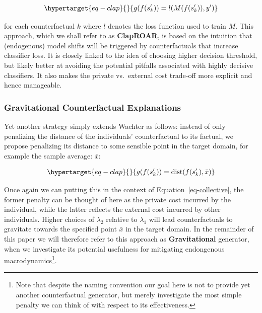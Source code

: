\documentclass[
  conference]{IEEEtran}
\begin{document}
\begin{equation}\protect\hypertarget{eq-clap}{}{
\begin{aligned}
g(f(s_k^\prime)) = l(M(f(s_k^\prime)),y^\prime)
\end{aligned}
}\label{eq-clap}\end{equation}

for each counterfactual \(k\) where \(l\) denotes the loss function used
to train \(M\). This approach, which we shall refer to as
\textbf{ClapROAR}, is based on the intuition that (endogenous) model
shifts will be triggered by counterfactuals that increase classifier
loss. It is closely linked to the idea of choosing higher decision
threshold, but likely better at avoiding the potential pitfalls
associated with highly decisive classifiers. It also makes the private
vs.~external cost trade-off more explicit and hence manageable.

\hypertarget{gravitational-counterfactual-explanations}{%
\subsubsection{Gravitational Counterfactual
Explanations}\label{gravitational-counterfactual-explanations}}

Yet another strategy simply extends Wachter as follows: instead of only
penalizing the distance of the individuals' counterfactual to its
factual, we propose penalizing its distance to some sensible point in
the target domain, for example the sample average: \(\bar{x}\):

\begin{equation}\protect\hypertarget{eq-clap}{}{
\begin{aligned}
g(f(s_k^\prime)) = \text{dist}(f(s_k^\prime),\bar{x})
\end{aligned}
}\label{eq-clap}\end{equation}

Once again we can putting this in the context of
Equation~\ref{eq-collective}, the former penalty can be thought of here
as the private cost incurred by the individual, while the latter
reflects the external cost incurred by other individuals. Higher choices
of \(\lambda_2\) relative to \(\lambda_1\) will lead counterfactuals to
gravitate towards the specified point \(\bar{x}\) in the target domain.
In the remainder of this paper we will therefore refer to this approach
as \textbf{Gravitational} generator, when we investigate its potential
usefulness for mitigating endongenous macrodynamics\footnote{Note that
  despite the naming convention our goal here is not to provide yet
  another counterfactual generator, but merely investigate the most
  simple penalty we can think of with respect to its effectiveness.}.
\end{document}
